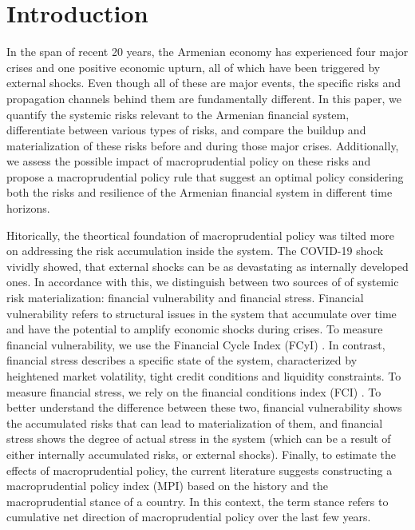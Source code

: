 \section{Introduction}
\label{introduction}
In the span of recent 20 years, the Armenian economy has experienced four major crises and one positive economic upturn, all of which have been triggered by external shocks. Even though all of these are major events, the specific risks and propagation channels behind them are fundamentally different. In this paper, we quantify the systemic risks relevant to the Armenian financial system, differentiate between various types of risks, and compare the buildup and materialization of these risks before and during those major crises. Additionally, we assess the possible impact of macroprudential policy on these risks and propose a macroprudential policy rule that suggest an optimal policy considering both the risks and resilience of the Armenian financial system in different time horizons.

Hitorically, the theortical foundation of macroprudential policy was tilted more on addressing the risk accumulation inside the system. The COVID-19 shock vividly showed, that external shocks can be as devastating as internally developed ones. In accordance with this, we distinguish between two sources of of systemic risk materialization: financial vulnerability and financial stress. Financial vulnerability refers to structural issues in the system that accumulate over time and have the potential to amplify economic shocks during crises. To measure financial vulnerability, we use the Financial Cycle Index (FCyI) \citep{hollo2012, plasil2014}. In contrast, financial stress describes a specific state of the system, characterized by heightened market volatility, tight credit conditions and liquidity constraints. To measure financial stress, we rely on the financial conditions index (FCI) \citep{koop_2013}. To better understand the difference between these two, financial vulnerability shows the accumulated risks that can lead to materialization of them, and financial stress shows the degree of actual stress in the system (which can be a result of either internally accumulated risks, or external shocks). Finally, to estimate the effects of macroprudential policy, the current literature \citep{alam2019, galan2020} suggests constructing a macroprudential policy index (MPI) based on the history and the macroprudential stance of a country. In this context, the term stance refers to cumulative net direction of macroprudential policy over the last few years.

